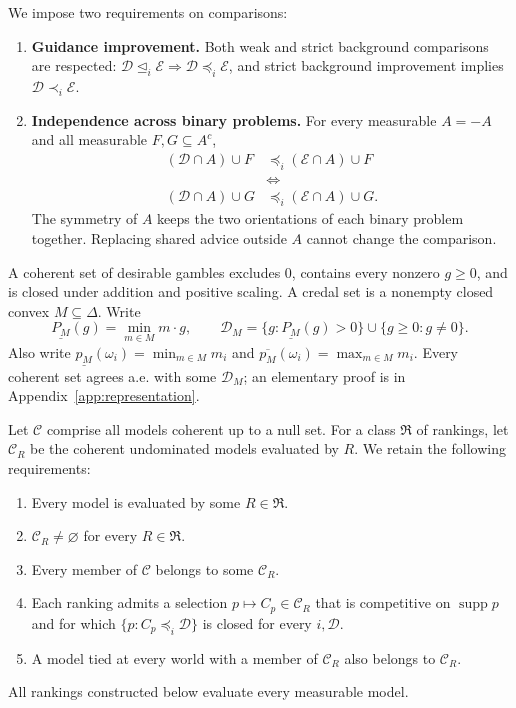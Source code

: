 \documentclass[11pt]{article}
\theoremstyle{remark}
\newcommand{\Dscr}{\mathcal D}
\newcommand{\Escr}{\mathcal E}
\newcommand{\supp}{\operatorname{supp}}
\newcommand{\lpr}[1]{\underline{P_{#1}}}
\newcommand{\lowprob}[1]{\underline{p_{#1}}}
\newcommand{\upprob}[1]{\overline{p_{#1}}}
\begin{document}
We impose two requirements on comparisons:
\begin{enumerate}[leftmargin=*,itemsep=5pt]
\item[\textbf{(G)}] \textbf{Guidance improvement.} Both weak and strict
background comparisons are respected:
$\Dscr\unlhd_i\Escr\Rightarrow\Dscr\preceq_i\Escr$, and strict background
improvement implies $\Dscr\prec_i\Escr$.
\item[\textbf{(IB)}] \textbf{Independence across binary problems.} For every
measurable $A=-A$ and all measurable $F,G\subseteq A^c$,
\begin{equation}
 \begin{aligned}
 (\Dscr\cap A)\cup F&\preceq_i(\Escr\cap A)\cup F\\
 &\Longleftrightarrow\\[-6pt]
 (\Dscr\cap A)\cup G&\preceq_i(\Escr\cap A)\cup G.
 \end{aligned}\label{eq:independence}
\end{equation}
The symmetry of $A$ keeps the two orientations of each binary problem
together. Replacing shared advice outside $A$ cannot change the comparison.
\end{enumerate}

A coherent set of desirable gambles excludes $0$, contains every nonzero
$g\ge0$, and is closed under addition and positive scaling.
A credal set is a nonempty closed convex $M\subseteq\Delta$. Write
\[
 \lpr{M}(g)=\min_{m\in M}m\cdot g,\qquad
 \Dscr_M=\{g:\lpr{M}(g)>0\}\cup\{g\ge0:g\ne0\}.
\]
Also write $\lowprob{M}(\omega_i)=\min_{m\in M}m_i$ and
$\upprob{M}(\omega_i)=\max_{m\in M}m_i$.
Every coherent set agrees a.e. with some $\Dscr_M$; an elementary proof is in
Appendix~\ref{app:representation}.

Let $\mathcal C$ comprise all models coherent up to a null set. For a class
$\mathfrak R$ of rankings, let $\mathcal C_R$ be the coherent undominated
models evaluated by $R$. We retain the following requirements:
\begin{enumerate}[leftmargin=*,itemsep=3pt]
\item[\textbf{(E)}] Every model is evaluated by some $R\in\mathfrak R$.
\item[\textbf{(LA)}] $\mathcal C_R\ne\varnothing$ for every $R\in\mathfrak R$.
\item[\textbf{(A)}] Every member of $\mathcal C$ belongs to some $\mathcal C_R$.
\item[\textbf{(S)}] Each ranking admits a selection $p\mapsto C_p\in\mathcal C_R$
that is competitive on $\supp p$ and for which
$\{p:C_p\preceq_i\Dscr\}$ is closed for every $i,\Dscr$.
\item[\textbf{(C)}] A model tied at every world with a member of $\mathcal C_R$
also belongs to $\mathcal C_R$.
\end{enumerate}
All rankings constructed below evaluate every measurable model.
\end{document}
